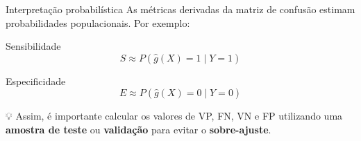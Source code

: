 \documentclass[
  ignorenonframetext,
  aspectratio=169,
]{beamer}
\begin{document}
\begin{frame}{Interpretação probabilística}
\label{interpretauxe7uxe3o-probabiluxedstica}
As métricas derivadas da matriz de confusão estimam probabilidades
populacionais. Por exemplo:

\begin{block}{Sensibilidade}
\label{sensibilidade}
\[
S \approx P(\hat g(X)=1 \mid Y=1)
\]
\end{block}

\begin{block}{Especificidade}
\label{especificidade}
\[
E \approx P(\hat g(X)=0 \mid Y=0)
\]

{💡} Assim, é importante calcular os valores de VP, FN, VN e FP
utilizando uma \textbf{amostra de teste} ou \textbf{validação} para
evitar o \textbf{sobre-ajuste}.
\end{block}
\end{frame}
\end{document}
